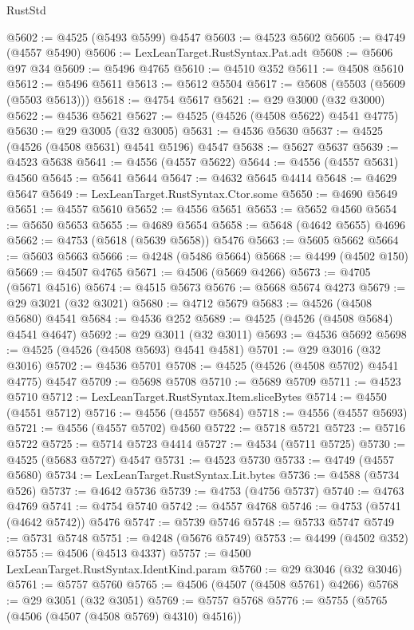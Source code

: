 \begin{lexlean}{RustStd}
\begin{coremodule}
{\begin{coremodule}
{{{{{{{{{{{{{{{{{{{{{{{{{{{{{{{{{{{{{{{{{{{{{{{{{{{{{{{@5602 := @4525 (@5493 @5599) @4547
@5603 := @4523 @5602
@5605 := @4749 (@4557 @5490)
@5606 := LexLeanTarget.RustSyntax.Pat.adt
@5608 := @5606 @97 @34
@5609 := @5496 @4765
@5610 := @4510 @352
@5611 := @4508 @5610
@5612 := @5496 @5611
@5613 := @5612 @5504
@5617 := @5608 (@5503 (@5609 (@5503 @5613)))
@5618 := @4754 @5617
@5621 := @29 @3000 (@32 @3000)
@5622 := @4536 @5621
@5627 := @4525 (@4526 (@4508 @5622) @4541 @4775)
@5630 := @29 @3005 (@32 @3005)
@5631 := @4536 @5630
@5637 := @4525 (@4526 (@4508 @5631) @4541 @5196) @4547
@5638 := @5627 @5637
@5639 := @4523 @5638
@5641 := @4556 (@4557 @5622)
@5644 := @4556 (@4557 @5631) @4560
@5645 := @5641 @5644
@5647 := @4632 @5645 @4414
@5648 := @4629 @5647
@5649 := LexLeanTarget.RustSyntax.Ctor.some
@5650 := @4690 @5649
@5651 := @4557 @5610
@5652 := @4556 @5651
@5653 := @5652 @4560
@5654 := @5650 @5653
@5655 := @4689 @5654
@5658 := @5648 (@4642 @5655) @4696
@5662 := @4753 (@5618 (@5639 @5658)) @5476
@5663 := @5605 @5662
@5664 := @5603 @5663
@5666 := @4248 (@5486 @5664)
@5668 := @4499 (@4502 @150)
@5669 := @4507 @4765
@5671 := @4506 (@5669 @4266)
@5673 := @4705 (@5671 @4516)
@5674 := @4515 @5673
@5676 := @5668 @5674 @4273
@5679 := @29 @3021 (@32 @3021)
@5680 := @4712 @5679
@5683 := @4526 (@4508 @5680) @4541
@5684 := @4536 @252
@5689 := @4525 (@4526 (@4508 @5684) @4541 @4647)
@5692 := @29 @3011 (@32 @3011)
@5693 := @4536 @5692
@5698 := @4525 (@4526 (@4508 @5693) @4541 @4581)
@5701 := @29 @3016 (@32 @3016)
@5702 := @4536 @5701
@5708 := @4525 (@4526 (@4508 @5702) @4541 @4775) @4547
@5709 := @5698 @5708
@5710 := @5689 @5709
@5711 := @4523 @5710
@5712 := LexLeanTarget.RustSyntax.Item.sliceBytes
@5714 := @4550 (@4551 @5712)
@5716 := @4556 (@4557 @5684)
@5718 := @4556 (@4557 @5693)
@5721 := @4556 (@4557 @5702) @4560
@5722 := @5718 @5721
@5723 := @5716 @5722
@5725 := @5714 @5723 @4414
@5727 := @4534 (@5711 @5725)
@5730 := @4525 (@5683 @5727) @4547
@5731 := @4523 @5730
@5733 := @4749 (@4557 @5680)
@5734 := LexLeanTarget.RustSyntax.Lit.bytes
@5736 := @4588 (@5734 @526)
@5737 := @4642 @5736
@5739 := @4753 (@4756 @5737)
@5740 := @4763 @4769
@5741 := @4754 @5740
@5742 := @4557 @4768
@5746 := @4753 (@5741 (@4642 @5742)) @5476
@5747 := @5739 @5746
@5748 := @5733 @5747
@5749 := @5731 @5748
@5751 := @4248 (@5676 @5749)
@5753 := @4499 (@4502 @352)
@5755 := @4506 (@4513 @4337)
@5757 := @4500 LexLeanTarget.RustSyntax.IdentKind.param
@5760 := @29 @3046 (@32 @3046)
@5761 := @5757 @5760
@5765 := @4506 (@4507 (@4508 @5761) @4266)
@5768 := @29 @3051 (@32 @3051)
@5769 := @5757 @5768
@5776 := @5755 (@5765 (@4506 (@4507 (@4508 @5769) @4310) @4516))
}}}}}}}}}}}}}}}}}}}}}}}}}}}}}}}}}}}}}}}}}}}}}}}}}}}}}}}
\end{coremodule}}
\end{coremodule}
\end{lexlean}
